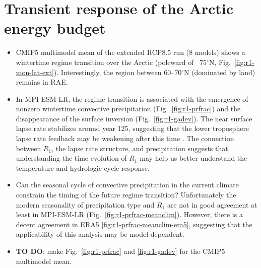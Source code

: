 \documentclass{article}
\begin{document}
\section{Transient response of the Arctic energy budget}
\begin{itemize}
    \item CMIP5 multimodel mean of the extended RCP8.5 run (8 models) shows a wintertime regime transition over the Arctic (poleward of ~75$^\circ$N, Fig.~\ref{fig:r1-mon-lat-ext}). Interestingly, the region between 60--70$^\circ$N (dominated by land) remains in RAE.
    \item In MPI-ESM-LR, the regime transition is associated with the emergence of nonzero wintertime convective precipitation (Fig.~\ref{fig:r1-prfrac}) and the disappearance of the surface inversion (Fig.~\ref{fig:r1-gadev}). The near surface lapse rate stabilizes around year 125, suggesting that the lower troposphere lapse rate feedback may be weakening after this time \citep[consistent with][]{bintanja2012}. The connection between $R_1$, the lapse rate structure, and precipitation suggests that understanding the time evolution of $R_1$ may help us better understand the temperature and hydrologic cycle response.
    \item Can the seasonal cycle of convective precipitation in the current climate constrain the timing of the future regime transition? Unfortunately the modern seasonality of precipitation type and $R_1$ are not in good agreement at least in MPI-ESM-LR (Fig.~\ref{fig:r1-prfrac-meanclim}). However, there is a decent agreement in ERA5 \ref{fig:r1-prfrac-meanclim-era5}, suggesting that the applicability of this analysis may be model-dependent.
    \item \textbf{TO DO}: make Fig.~\ref{fig:r1-prfrac} and \ref{fig:r1-gadev} for the CMIP5 multimodel mean.
\end{itemize}
\end{document}
